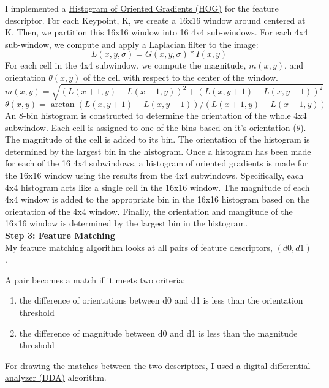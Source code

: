 \documentclass[12pt]{article}
\begin{document}
I implemented a 
\href{https://en.wikipedia.org/wiki/Histogram_of_oriented_gradients}{Histogram of Oriented Gradients (HOG)}
for the feature descriptor.
For each Keypoint, K, we create a 16x16 window around centered at K.
Then, we partition this 16x16 window into 16 4x4 sub-windows.
For each 4x4 sub-window, we compute and apply a Laplacian filter to the image:
\[
    L(x,y,\sigma) = G(x,y,\sigma) * I(x,y)
\]
For each cell in the 4x4 subwindow, we compute the magnitude, $m(x,y)$, and orientation
$ \theta (x,y) $ of the cell with respect to the center of the window.
\[
    m(x,y) = \sqrt{(L(x+1,y)-L(x-1,y))^2+(L(x,y+1)-L(x,y-1))^2}
\]
\[
    \theta (x,y) = \arctan{(L(x,y+1)-L(x,y-1))/(L(x+1,y)-L(x-1,y))}
\]
An 8-bin histogram is constructed to determine the orientation of the whole 4x4
subwindow. Each cell is assigned to one of the bins based on it's orientation ($\theta$).
The magnitude of the cell is added to its bin. 
The orientation of the histogram is determined by the largest bin in the histogram.
Once a histogram has been made for each of the 16 4x4 subwindows, a histogram of 
oriented gradients is made for the 16x16 window using the results from the 4x4 subwindows.
Specifically, each 4x4 histogram acts like a single cell in the 16x16 window.
The magnitude of each 4x4 window is added to the appropriate bin in the 16x16 histogram 
based on the orientation of the 4x4 window. 
Finally, the orientation and mangitude of the 16x16 window is determined by the 
largest bin in the histogram. \\

\textbf{Step 3: Feature Matching}\\

My feature matching algorithm looks at all pairs of feature descriptors, $(d0,d1)$.

A pair becomes a match if it meets two criteria:
\begin{enumerate}
    \item the difference of orientations between d0 and d1 is less than the orientation threshold
    \item the difference of magnitude between d0 and d1 is less than the magnitude threshold
\end{enumerate}

For drawing the matches between the two descriptors, I used a 
\href{https://en.wikipedia.org/wiki/Digital_differential_analyzer_(graphics_algorithm)}{digital differential analyzer (DDA)} 
algorithm.
\end{document}
